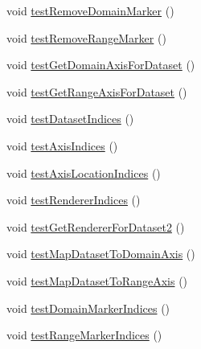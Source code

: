 \begin{DoxyCompactItemize}
\item 
void \mbox{\hyperlink{classorg_1_1jfree_1_1chart_1_1plot_1_1_category_plot_test_a51bdc9d7d0a553fd06b41d98cb91c3b5}{test\+Remove\+Domain\+Marker}} ()
\item 
void \mbox{\hyperlink{classorg_1_1jfree_1_1chart_1_1plot_1_1_category_plot_test_a56d0c3c66e3d340a330d3b3f997fcc1e}{test\+Remove\+Range\+Marker}} ()
\item 
void \mbox{\hyperlink{classorg_1_1jfree_1_1chart_1_1plot_1_1_category_plot_test_a1015823b04269acb15c4b01376b63450}{test\+Get\+Domain\+Axis\+For\+Dataset}} ()
\item 
void \mbox{\hyperlink{classorg_1_1jfree_1_1chart_1_1plot_1_1_category_plot_test_aace373a820dbfe6cdcd14af4f4f475a5}{test\+Get\+Range\+Axis\+For\+Dataset}} ()
\item 
void \mbox{\hyperlink{classorg_1_1jfree_1_1chart_1_1plot_1_1_category_plot_test_af07d8368007247590ed27417219e9cad}{test\+Dataset\+Indices}} ()
\item 
void \mbox{\hyperlink{classorg_1_1jfree_1_1chart_1_1plot_1_1_category_plot_test_a248cf9e4ca24be76735e85da85ff1b92}{test\+Axis\+Indices}} ()
\item 
void \mbox{\hyperlink{classorg_1_1jfree_1_1chart_1_1plot_1_1_category_plot_test_af7afbe16be45594e6583e49c086e9279}{test\+Axis\+Location\+Indices}} ()
\item 
void \mbox{\hyperlink{classorg_1_1jfree_1_1chart_1_1plot_1_1_category_plot_test_ae0d8c4ade4e7a95fa95edaecb79dcaee}{test\+Renderer\+Indices}} ()
\item 
void \mbox{\hyperlink{classorg_1_1jfree_1_1chart_1_1plot_1_1_category_plot_test_a7bb89de3b6c5caa578956f1e70f35e18}{test\+Get\+Renderer\+For\+Dataset2}} ()
\item 
void \mbox{\hyperlink{classorg_1_1jfree_1_1chart_1_1plot_1_1_category_plot_test_a5b6b20ff0a55bc60e9e109ced141ac14}{test\+Map\+Dataset\+To\+Domain\+Axis}} ()
\item 
void \mbox{\hyperlink{classorg_1_1jfree_1_1chart_1_1plot_1_1_category_plot_test_aee37fb9bb25a32089f4c58fb04349735}{test\+Map\+Dataset\+To\+Range\+Axis}} ()
\item 
void \mbox{\hyperlink{classorg_1_1jfree_1_1chart_1_1plot_1_1_category_plot_test_a36af8dd9bbd93ea285357540b08358ea}{test\+Domain\+Marker\+Indices}} ()
\item 
void \mbox{\hyperlink{classorg_1_1jfree_1_1chart_1_1plot_1_1_category_plot_test_a1b73bf4b829e875e2c270505351f22c4}{test\+Range\+Marker\+Indices}} ()
\end{DoxyCompactItemize}


